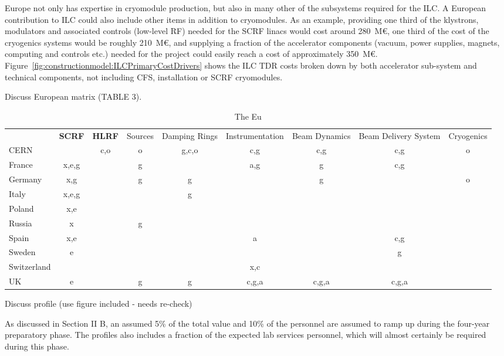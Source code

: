 \documentclass[%
 reprint,
 amsmath,amssymb,
 aps,
]{revtex4-1}
\begin{document}
Europe not only has expertise in cryomodule production, but also in many other 
of the subsystems required for the ILC. A European contribution to ILC could 
also include other items in addition to cryomodules. As an example, providing 
one third of the klystrons, modulators and associated controls (low-level RF) 
needed for the SCRF linacs would cost around 280~M\euro{}, one third of the cost of 
the cryogenics systems would be roughly 210~M\euro{}, and supplying a fraction of the 
accelerator components (vacuum, power supplies, magnets, computing and controls 
etc.) needed for the project could easily reach a cost of approximately 350~M\euro{}. 
Figure~\ref{fig:constructionmodel:ILCPrimaryCostDrivers} shows the ILC TDR costs broken down by both accelerator sub-system and 
technical components, not including CFS, installation or SCRF cryomodules.

Discuss European matrix (TABLE 3).

\begin{table}
\begin{tabular}{lcccccccc}
	&\bfseries SCRF	& \bfseries HLRF	&Sources&Damping Rings	&Instrumentation&Beam Dynamics	&Beam Delivery System	&Cryogenics \\
CERN	&	&c,o	&o	&g,c,o		&c,g		&c,g		&c,g			&o\\
France	&x,e,g	&	&g	&		&a,g		&g		&c,g			&\\
Germany	&x,g	&	&g	&g		&		&g		&			&o\\
Italy	&x,e,g	&	&	&g		&		&		&			&\\
Poland	&x,e	&	&	&		&		&		&			&\\
Russia	&x	&	&g	&		&		&		&			&\\
Spain	&x,e	&	&	&		&a		&		&c,g			&\\
Sweden	&e	&	&	&		&		&		&g			&\\
Switzerland& 	&	&	&		&x,c		&		&			&\\
UK	&e	&	&g	&g		&c,g,a		&c,g,a		&c,g,a			&\\
    
\end{tabular}
\caption{The Eu}
\end{table}


Discuss profile (use figure included - needs re-check)

As discussed in Section II B, an assumed 5\% of the total value and 10\% of the personnel are assumed
to ramp up during the four-year preparatory phase. The profiles also includes a fraction
of the expected lab services personnel, which will almost certainly be required during this
phase. 
\end{document}
